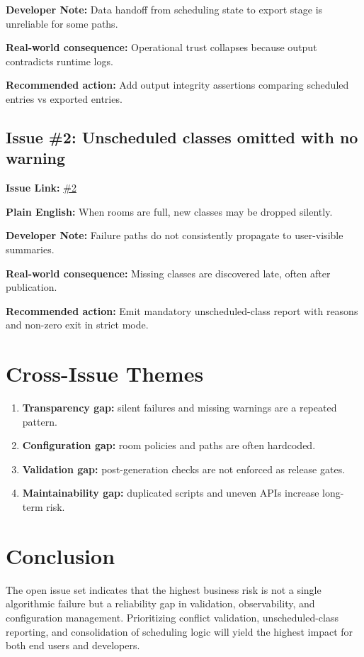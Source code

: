 \documentclass[12pt,a4paper]{article}
\begin{document}
\textbf{Developer Note:} Data handoff from scheduling state to export stage is unreliable for some paths.

\textbf{Real-world consequence:} Operational trust collapses because output contradicts runtime logs.

\textbf{Recommended action:} Add output integrity assertions comparing scheduled entries vs exported entries.

\subsection*{Issue \#2: Unscheduled classes omitted with no warning}
\textbf{Issue Link:} \href{https://github.com/ArnavBallinCode/TimetableIIITDWD/issues/2}{\#2}

\textbf{Plain English:} When rooms are full, new classes may be dropped silently.

\textbf{Developer Note:} Failure paths do not consistently propagate to user-visible summaries.

\textbf{Real-world consequence:} Missing classes are discovered late, often after publication.

\textbf{Recommended action:} Emit mandatory unscheduled-class report with reasons and non-zero exit in strict mode.

\section{Cross-Issue Themes}
\begin{enumerate}[leftmargin=1.2cm]
  \item \textbf{Transparency gap:} silent failures and missing warnings are a repeated pattern.
  \item \textbf{Configuration gap:} room policies and paths are often hardcoded.
  \item \textbf{Validation gap:} post-generation checks are not enforced as release gates.
  \item \textbf{Maintainability gap:} duplicated scripts and uneven APIs increase long-term risk.
\end{enumerate}

\section*{Conclusion}
The open issue set indicates that the highest business risk is not a single algorithmic failure but a reliability gap in validation, observability, and configuration management. Prioritizing conflict validation, unscheduled-class reporting, and consolidation of scheduling logic will yield the highest impact for both end users and developers.
\end{document}
